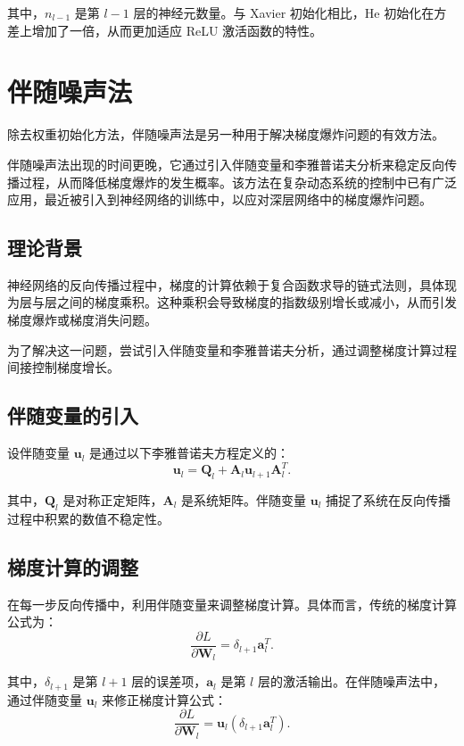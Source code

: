 其中，\( n_{l-1} \) 是第 \( l-1 \) 层的神经元数量。与 Xavier 初始化相比，He 初始化在方差上增加了一倍，从而更加适应 ReLU 激活函数的特性。

\section{伴随噪声法}

除去权重初始化方法，伴随噪声法是另一种用于解决梯度爆炸问题的有效方法。

伴随噪声法出现的时间更晚，它通过引入伴随变量和李雅普诺夫分析来稳定反向传播过程，从而降低梯度爆炸的发生概率。该方法在复杂动态系统的控制中已有广泛应用，最近被引入到神经网络的训练中，以应对深层网络中的梯度爆炸问题。

\subsection{理论背景}

神经网络的反向传播过程中，梯度的计算依赖于复合函数求导的链式法则，具体现为层与层之间的梯度乘积。这种乘积会导致梯度的指数级别增长或减小，从而引发梯度爆炸或梯度消失问题。

为了解决这一问题，尝试引入伴随变量和李雅普诺夫分析，通过调整梯度计算过程间接控制梯度增长。

\subsection{伴随变量的引入}

设伴随变量 \( \mathbf{u}_l \) 是通过以下李雅普诺夫方程定义的：
\begin{equation}
  \mathbf{u}_l = \mathbf{Q}_l + \mathbf{A}_l \mathbf{u}_{l+1} \mathbf{A}_l^T.
\end{equation}

其中，\( \mathbf{Q}_l \) 是对称正定矩阵，\( \mathbf{A}_l \) 是系统矩阵。伴随变量 \( \mathbf{u}_l \) 捕捉了系统在反向传播过程中积累的数值不稳定性。

\subsection{梯度计算的调整}

在每一步反向传播中，利用伴随变量来调整梯度计算。具体而言，传统的梯度计算公式为：
\begin{equation}
  \frac{\partial L}{\partial \mathbf{W}_l} = \delta_{l+1} \mathbf{a}_l^T.
\end{equation}

其中，\( \delta_{l+1} \) 是第 \( l+1 \) 层的误差项，\( \mathbf{a}_l \) 是第 \( l \) 层的激活输出。在伴随噪声法中，通过伴随变量 \( \mathbf{u}_l \) 来修正梯度计算公式：
\begin{equation}
  \frac{\partial L}{\partial \mathbf{W}_l} = \mathbf{u}_l (\delta_{l+1} \mathbf{a}_l^T).
\end{equation}


